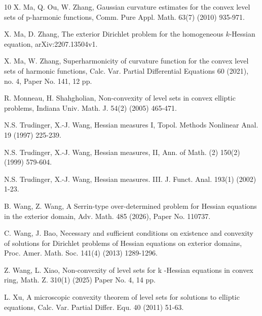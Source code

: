 \documentclass[reqno]{amsart}
\theoremstyle{remark}
\theoremstyle{definition}
\numberwithin{equation}{section}
\begin{document}
\begin{thebibliography}{10}
 X. Ma, Q. Ou, W. Zhang, Gaussian curvature estimates for the convex level sets of p-harmonic
functions, Comm. Pure Appl. Math. 63(7)  (2010) 935-971.

 X. Ma, D. Zhang, The exterior Dirichlet problem for the homogeneous $k$-Hessian equation, arXiv:2207.13504v1.

 X. Ma, W. Zhang, Superharmonicity of curvature function for the convex level sets of harmonic functions,
Calc. Var. Partial Differential Equations 60 (2021), no. 4, Paper No. 141, 12 pp.

 R. Monneau, H. Shahgholian,  Non-convexity of level sets in convex elliptic problems, Indiana Univ. Math. J. 54(2) (2005) 465-471.


 N.S. Trudinger, X.-J. Wang, Hessian measures I, Topol. Methods Nonlinear Anal. 19 (1997) 225-239.

 N.S. Trudinger, X.-J. Wang, Hessian measures, II, Ann. of Math. (2) 150(2) (1999) 579-604. 

 N.S. Trudinger, X.-J. Wang, Hessian measures. III. J. Funct. Anal. 193(1) (2002) 1-23.

 B. Wang, Z. Wang, A Serrin-type over-determined problem for Hessian equations in the exterior domain,
Adv. Math. 485 (2026), Paper No. 110737.

 C. Wang, J. Bao, Necessary and sufficient conditions on existence and convexity of solutions for Dirichlet problems of Hessian equations on exterior domains, Proc. Amer. Math. Soc. 141(4) (2013) 1289-1296.


 Z. Wang, L. Xiao, Non-convexity of level sets for  k -Hessian equations in convex ring, Math. Z. 310(1) (2025) Paper No. 4, 14 pp.

 L. Xu, A microscopic convexity theorem of level sets for solutions to elliptic equations, Calc. Var. Partial Differ. 
Equ. 40 (2011) 51-63.






\end{thebibliography}
\end{document}
